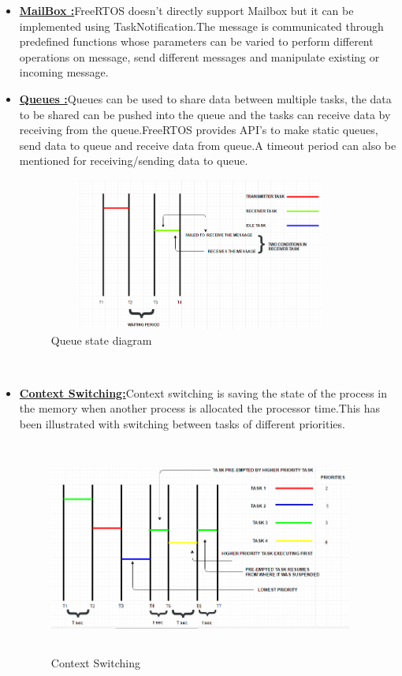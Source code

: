 \documentclass[a4paper,12pt,oneside]{book}
\begin{document}
\begin{itemize}
\\
\item \textbf{\href{https://github.com/eYSIP-2016/RTOS_LPC2148/tree/master/Codes/MailBox}{MailBox :}}FreeRTOS doesn't directly support Mailbox but it can be implemented using TaskNotification.The message is communicated through predefined functions whose parameters can be varied to perform different operations on message, send different messages and manipulate existing or incoming message.
\\
\item \textbf{\href{https://github.com/eYSIP-2016/RTOS_LPC2148/tree/master/Codes/Queue}{Queues :}}Queues can be used to share data between multiple tasks, the data to be shared can be pushed into the queue and the tasks can receive data by receiving from the queue.FreeRTOS provides API's to make static queues, send data to queue and receive data from queue.A timeout period can also be mentioned for receiving/sending data to queue.
\begin{figure}[h]
\centering
\includegraphics[width=10cm,height=5cm]{QUEUE.PNG}
\caption{Queue state diagram}
\end{figure}

\\
\item \textbf{\href{https://github.com/eYSIP-2016/RTOS_LPC2148/tree/master/Codes/ContextSwitching}{Context Switching:}}Context switching is saving the state of the process in the memory when another process is allocated the processor time.This has been illustrated with switching between tasks of different priorities.
\begin{figure}[h]
\centering
\includegraphics[width=10cm,height=7cm]{CONTEXTSWITCHING.PNG}
\caption{Context Switching}
\end{figure}
\newpage



\end{itemize}
\end{document}
